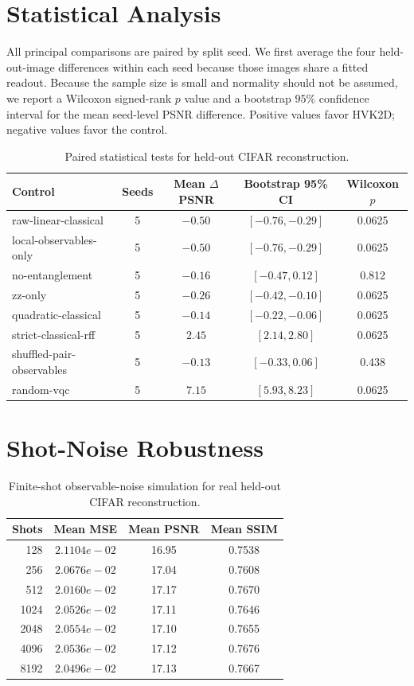 \documentclass[journal]{IEEEtran}
\begin{document}
\section{Statistical Analysis}
All principal comparisons are paired by split seed. We first average the four
held-out-image differences within each seed because those images share a fitted
readout. Because the sample size is small and normality should not be assumed,
we report a Wilcoxon signed-rank $p$ value and a bootstrap $95\%$ confidence
interval for the mean seed-level PSNR difference. Positive values favor HVK2D;
negative values favor the control.

\begin{table}[t]
\centering
\caption{Paired statistical tests for held-out CIFAR reconstruction.}
\label{tab:paired_stats_q1}
\scriptsize
\begin{tabular}{lcccc}
\toprule
Control & Seeds & Mean $\Delta$PSNR & Bootstrap 95\% CI & Wilcoxon $p$ \\
\midrule
raw-linear-classical & 5 & $-0.50$ & $[-0.76,-0.29]$ & 0.0625 \\
local-observables-only & 5 & $-0.50$ & $[-0.76,-0.29]$ & 0.0625 \\
no-entanglement & 5 & $-0.16$ & $[-0.47,0.12]$ & 0.812 \\
zz-only & 5 & $-0.26$ & $[-0.42,-0.10]$ & 0.0625 \\
quadratic-classical & 5 & $-0.14$ & $[-0.22,-0.06]$ & 0.0625 \\
strict-classical-rff & 5 & $2.45$ & $[2.14,2.80]$ & 0.0625 \\
shuffled-pair-observables & 5 & $-0.13$ & $[-0.33,0.06]$ & 0.438 \\
random-vqc & 5 & $7.15$ & $[5.93,8.23]$ & 0.0625 \\
\bottomrule
\end{tabular}
\end{table}

\section{Shot-Noise Robustness}
\begin{table}[t]
\centering
\caption{Finite-shot observable-noise simulation for real held-out CIFAR reconstruction.}
\label{tab:shot_noise_q1}
\scriptsize
\begin{tabular}{rccc}
\toprule
Shots & Mean MSE & Mean PSNR & Mean SSIM \\
\midrule
128 & $2.1104e-02$ & 16.95 & 0.7538 \\
256 & $2.0676e-02$ & 17.04 & 0.7608 \\
512 & $2.0160e-02$ & 17.17 & 0.7670 \\
1024 & $2.0526e-02$ & 17.11 & 0.7646 \\
2048 & $2.0554e-02$ & 17.10 & 0.7655 \\
4096 & $2.0536e-02$ & 17.12 & 0.7676 \\
8192 & $2.0496e-02$ & 17.13 & 0.7667 \\
\bottomrule
\end{tabular}
\end{table}
\end{document}

